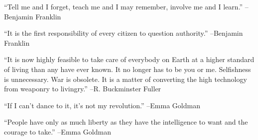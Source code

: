 \documentclass{article}%
\begin{document}
\linebreak%
\vspace{1mm}%
\begin{minipage}{\textwidth}%
\flushleft%
“Tell me and I forget, teach me and I may remember, involve me and I learn.”%
\linebreak%
\vspace{1mm}%
–Benjamin Franklin%
\linebreak%
\vspace{1mm}%
\end{minipage}%
\linebreak%
\vspace{1mm}%
\begin{minipage}{\textwidth}%
\flushleft%
“It is the first responsibility of every citizen to question authority.”%
\linebreak%
\vspace{1mm}%
–Benjamin Franklin%
\linebreak%
\vspace{1mm}%
\end{minipage}%
\linebreak%
\vspace{1mm}%
\begin{minipage}{\textwidth}%
\flushleft%
“It is now highly feasible to take care of everybody on Earth at a higher standard of living than any have ever known. It no longer has to be you or me. Selfishness is unnecessary. War is obsolete. It is a matter of converting the high technology from weaponry to livingry.”%
\linebreak%
\vspace{1mm}%
–R. Buckminster Fuller%
\linebreak%
\vspace{1mm}%
\end{minipage}%
\linebreak%
\vspace{1mm}%
\begin{minipage}{\textwidth}%
\flushleft%
“If I can't dance to it, it's not my revolution.”%
\linebreak%
\vspace{1mm}%
–Emma Goldman%
\linebreak%
\vspace{1mm}%
\end{minipage}%
\linebreak%
\vspace{1mm}%
\begin{minipage}{\textwidth}%
\flushleft%
“People have only as much liberty as they have the intelligence to want and the courage to take.”%
\linebreak%
\vspace{1mm}%
–Emma Goldman%
\linebreak%
\vspace{1mm}%
\end{minipage}%
\end{document}
